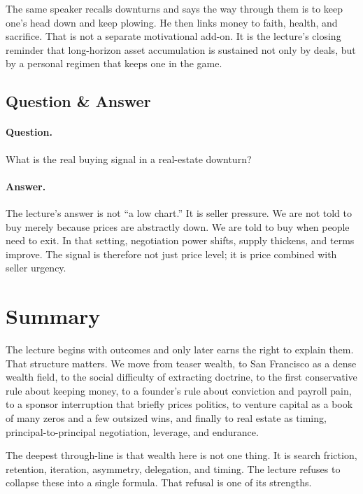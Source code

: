 The same speaker recalls downturns and says the way through them is to keep one's head down and keep plowing. He then links money to faith, health, and sacrifice. That is not a separate motivational add-on. It is the lecture's closing reminder that long-horizon asset accumulation is sustained not only by deals, but by a personal regimen that keeps one in the game.

\subsection{Question \& Answer}

\paragraph{Question.} What is the real buying signal in a real-estate downturn?

\paragraph{Answer.} The lecture's answer is not ``a low chart.'' It is seller pressure. We are not told to buy merely because prices are abstractly down. We are told to buy when people need to exit. In that setting, negotiation power shifts, supply thickens, and terms improve. The signal is therefore not just price level; it is price combined with seller urgency.

\section{Summary}

The lecture begins with outcomes and only later earns the right to explain them. That structure matters. We move from teaser wealth, to San Francisco as a dense wealth field, to the social difficulty of extracting doctrine, to the first conservative rule about keeping money, to a founder's rule about conviction and payroll pain, to a sponsor interruption that briefly prices politics, to venture capital as a book of many zeros and a few outsized wins, and finally to real estate as timing, principal-to-principal negotiation, leverage, and endurance.

The deepest through-line is that wealth here is not one thing. It is search friction, retention, iteration, asymmetry, delegation, and timing. The lecture refuses to collapse these into a single formula. That refusal is one of its strengths.